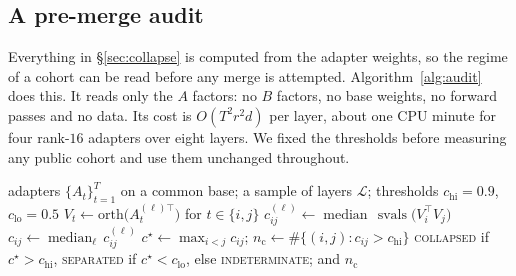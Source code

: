 \subsection{A pre-merge audit}\label{subsec:audit}

Everything in \S\ref{sec:collapse} is computed from the adapter weights, so
the regime of a cohort can be read before any merge is attempted.
Algorithm~\ref{alg:audit} does this. It reads only the $A$ factors: no $B$
factors, no base weights, no forward passes and no data. Its cost is
$O(T^2 r^2 d)$ per layer, about one CPU minute for four rank-$16$ adapters
over eight layers. We fixed the thresholds before measuring any public cohort
and use them unchanged throughout.

\begin{algorithm}[t]
\caption{Pre-merge audit of a LoRA cohort.}
\label{alg:audit}
\begin{algorithmic}[1]
\Require adapters $\{A_t\}_{t=1}^{T}$ on a common base; a sample of layers
  $\mathcal{L}$; thresholds $c_{\mathrm{hi}} = 0.9$, $c_{\mathrm{lo}} = 0.5$
    \State $V_t \gets \mathrm{orth}\bigl(A_t^{(\ell)\top}\bigr)$ for $t \in \{i, j\}$
    \State $c_{ij}^{(\ell)} \gets \operatorname{median}\,
      \operatorname{svals}\bigl(V_i^{\top} V_j\bigr)$
  \EndFor
  \State $c_{ij} \gets \operatorname{median}_{\ell}\, c_{ij}^{(\ell)}$
\EndFor
\State $c^\star \gets \max_{i<j} c_{ij}$;\quad
  $n_{\mathrm{c}} \gets \#\{(i,j) : c_{ij} > c_{\mathrm{hi}}\}$
\State \Return \textsc{collapsed} if $c^\star > c_{\mathrm{hi}}$,
  \textsc{separated} if $c^\star < c_{\mathrm{lo}}$, else
  \textsc{indeterminate}; and $n_{\mathrm{c}}$
\end{algorithmic}
\end{algorithm}


